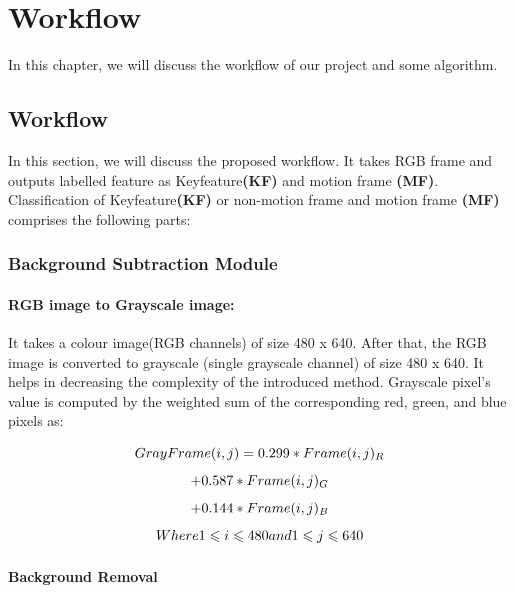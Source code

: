 \chapter{Workflow} %

\label{Chapter 4} 

In this chapter, we will discuss the workflow of our project and some algorithm.



\section{Workflow}
In this section, we will discuss the proposed workflow.
It takes RGB frame and outputs labelled feature as Keyfeature\textbf{(KF)} and motion frame \textbf{(MF)}. Classification of Keyfeature\textbf{(KF)} or non-motion frame and motion frame \textbf{(MF)} comprises the following parts:

\subsection{Background Subtraction Module}

\subsubsection{RGB image to Grayscale image:} 
It takes a colour image(RGB channels) of size 480 x 640. After that, the RGB image is converted to grayscale (single grayscale channel) of size 480 x 640. It helps in decreasing the complexity of the introduced method. Grayscale pixel’s value is computed by the weighted sum of the corresponding red, green, and blue pixels as:

\[\Large GrayFrame(i, j) = 0.299 \ast Frame(i, j)_R\]
\[\Large + 0.587 \ast Frame(i, j)_G\]
\[\Large + 0.144 \ast Frame(i, j)_B\]
\[\Large Where 1 \leqslant i \leqslant 480 and 1 \leqslant j \leqslant 640\]

\subsubsection{Background Removal}

